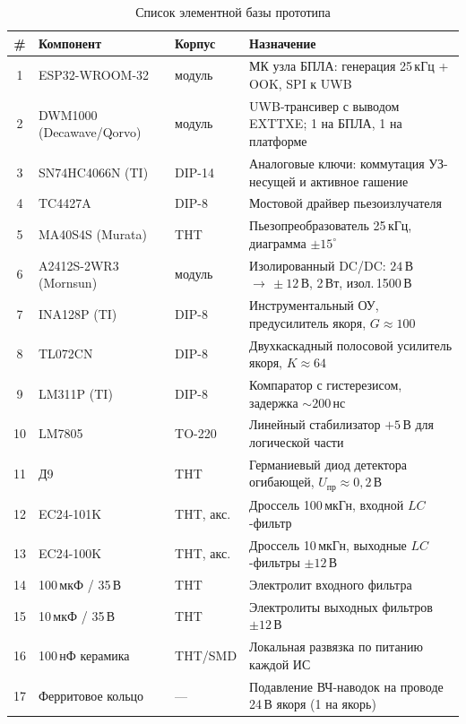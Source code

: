 \documentclass[a4paper,11pt]{article} %
\begin{document}
\begin{table}[h!]
\centering
\caption{Список элементной базы прототипа}
\label{tab:bom}
\footnotesize
\begin{tabular}{@{}cl l p{8.6cm}@{}}
\toprule
\#  & Компонент                  & Корпус        & Назначение \\ \midrule
1   & ESP32-WROOM-32             & модуль        & МК узла БПЛА: генерация 25\,кГц + OOK, SPI к UWB \\
2   & DWM1000 (Decawave/Qorvo)   & модуль        & UWB-трансивер с выводом EXTTXE; 1 на БПЛА, 1 на платформе \\
3   & SN74HC4066N (TI)           & DIP-14        & Аналоговые ключи: коммутация УЗ-несущей и активное гашение \\
4   & TC4427A                    & DIP-8         & Мостовой драйвер пьезоизлучателя \\
5   & MA40S4S (Murata)           & THT           & Пьезопреобразователь 25\,кГц, диаграмма $\pm 15^\circ$ \\
6   & A2412S-2WR3 (Mornsun)      & модуль        & Изолированный DC/DC: $24$\,В\,$\to\,\pm 12$\,В, 2\,Вт, изол.\,1500\,В \\
7   & INA128P (TI)               & DIP-8         & Инструментальный ОУ, предусилитель якоря, $G\!\approx\!100$ \\
8   & TL072CN                    & DIP-8         & Двухкаскадный полосовой усилитель якоря, $K\!\approx\!64$ \\
9   & LM311P (TI)                & DIP-8         & Компаратор с гистерезисом, задержка ${\sim}200$\,нс \\
10  & LM7805                     & TO-220        & Линейный стабилизатор $+5$\,В для логической части \\
11  & Д9                         & THT           & Германиевый диод детектора огибающей, $U_\text{пр}\!\approx\!0{,}2$\,В \\
12  & EC24-101K                  & THT, акс.     & Дроссель 100\,мкГн, входной $LC$-фильтр \\
13  & EC24-100K                  & THT, акс.     & Дроссель 10\,мкГн, выходные $LC$-фильтры $\pm 12$\,В \\
14  & 100\,мкФ / 35\,В           & THT           & Электролит входного фильтра \\
15  & 10\,мкФ / 35\,В            & THT           & Электролиты выходных фильтров $\pm 12$\,В \\
16  & 100\,нФ керамика           & THT/SMD       & Локальная развязка по питанию каждой ИС \\
17  & Ферритовое кольцо          & ---           & Подавление ВЧ-наводок на проводе 24\,В якоря (1 на якорь) \\
\bottomrule
\end{tabular}
\end{table}
\end{document}
